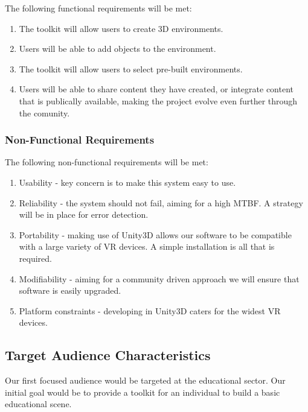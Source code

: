 \begin{flushleft}
	The following functional requirements will be met:

  		\begin{enumerate}
			\item The toolkit will allow users to create 3D environments.
			\item Users will be able to add objects to the environment.
			\item The toolkit will allow users to select pre-built environments.
			\item Users will be able to share content they have created, or integrate content that is publically available, making the project evolve even further through the comunity.
		\end{enumerate}

	\subsubsection{Non-Functional Requirements}

	The following non-functional requirements will be met:

		\begin{enumerate}
  			\item Usability - key concern is to make this system easy to use.
  			\item Reliability - the system should not fail, aiming for a high MTBF. A strategy will be in place for error detection.
  			\item Portability - making use of Unity3D allows our software to be compatible with a large variety of VR devices. A simple installation is all that is required.
  			\item Modifiability - aiming for a community driven approach we will ensure that software is easily upgraded.
  			\item Platform constraints - developing in Unity3D caters for the widest VR devices.
		\end{enumerate}

\subsection{Target Audience Characteristics}

	Our first focused audience would be targeted at the educational sector. Our initial goal would be to provide a toolkit for an individual to build a basic educational scene.


\end{flushleft}
